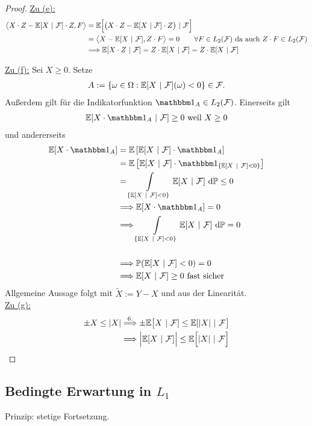 \begin{proof}
\underline{Zu (e):} 
\begin{align*}
\big\langle X\cdot Z-\mathbb{E}[X~|~\mathcal{F}]\cdot Z,F\big\rangle
&=\mathbb{E}\Big[\big(X\cdot Z-\mathbb{E}[X~|~\mathcal{F}]\cdot Z\big)~|~\mathcal{F}\Big]\\
&=\big\langle X-\mathbb{E}[X~|~\mathcal{F}],Z\cdot F\big\rangle=0\qquad\forall F\in L_2(\mathcal{F})\text{ da auch }Z\cdot F\in L_2(\mathcal{F})\\
&\Longrightarrow\mathbb{E}[X\cdot Z~|~\mathcal{F}]
=Z\cdot \mathbb{E}[X~|~\mathcal{F}]
=Z\cdot\mathbb{E}[X~|~\mathcal{F}]
\end{align*}

\underline{Zu (f):} Sei $X\geq0$. Setze
\begin{align*}
A:=\lbrace\omega\in\Omega:\mathbb{E}[X~|~\mathcal{F}](\omega)<0\rbrace\in\mathcal{F}.
\end{align*}
Außerdem gilt für die Indikatorfunktion $\indi_A\in L_2(\mathcal{F})$.
Einerseits gilt
\begin{align*}
\E[X\cdot\indi_A~|~\mathcal{F}]\geq0\text{ weil }X\geq0
\end{align*}
und andererseits
\begin{align*}
\E[X\cdot\indi_A]
&=\E\left[\E[X~|~\mathcal{F}]\cdot\indi_A\right]\\
&=\E\left[\E[X~|~\mathcal{F}]\cdot\indi_{\lbrace\E[X~|~\mathcal{F}]<0\rbrace}\right]\\
&=\int\limits_{\lbrace\E[X~|~\mathcal{F}]<0\rbrace} \E[X~|~\mathcal{F}]\d\P\leq0\\
&\Longrightarrow\E[X\cdot\indi_A]=0\\
&\Longrightarrow\int\limits_{\lbrace\E[X~|~\mathcal{F}]<0\rbrace} \E[X~|~\mathcal{F}]\d\P=0\\\\
&\Longrightarrow \P(\E[X~|~\mathcal{F}]<0)=0\\
&\Longrightarrow\E[X~|~\mathcal{F}]\geq0\text { fast sicher}
\end{align*}
Allgemeine Aussage folgt mit $\tilde{X}:=Y-X$ und aus der Linearität.\\

\underline{Zu (g):}
\begin{align*}
\pm X\leq|X|
\stackrel{6.}{\Longrightarrow}
\pm\mathbb{E}\big[X~|~\mathcal{F}]\leq\mathbb{E}[|X|~|~\mathcal{F}\big]\\
\Longrightarrow\Big|\mathbb{E}[X~|~\mathcal{F}]\Big|\leq\mathbb{E}\Big[|X|~|~\mathcal{F}\Big]
\end{align*}
\end{proof}
 
\subsection*{Bedingte Erwartung in $L_1$}
Prinzip: stetige Fortsetzung.


